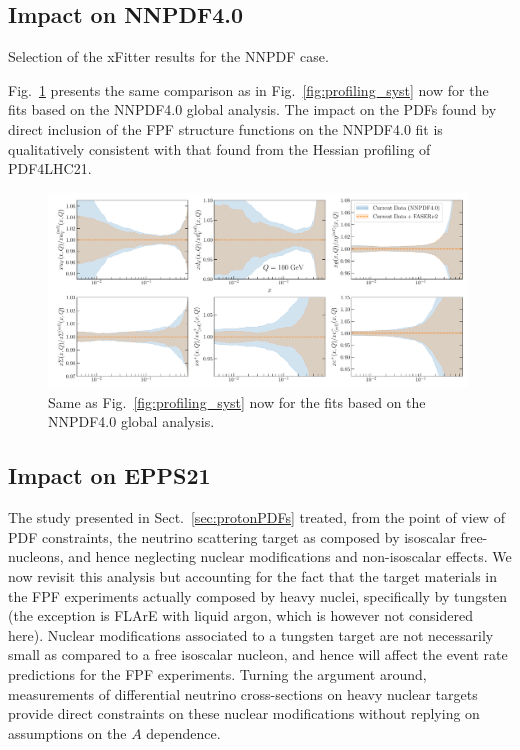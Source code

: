\clearpage


\subsection{Impact on NNPDF4.0}
\label{sec:nnpdf40}

Selection of the {\sc\small xFitter} results for the NNPDF case.

Fig.~\ref{fig:nnpdf40_fasernu2_baseline} presents the same comparison
as in Fig.~\ref{fig:profiling_syst} now for
 the fits
 based on the NNPDF4.0 global analysis.
 The impact on the PDFs found by direct inclusion of the FPF structure
 functions on the NNPDF4.0 fit is qualitatively consistent with
 that found from the Hessian profiling of PDF4LHC21.

\begin{figure}[t]
\centering
\includegraphics[width=0.99\textwidth]{plots/FASERnu2-q100gev-ratios.pdf}
\caption{
  Same as Fig.~\ref{fig:profiling_syst} now for the fits
  based on the NNPDF4.0 global analysis.
%
}
\label{fig:nnpdf40_fasernu2_baseline}
\end{figure}

\clearpage

\subsection{Impact on EPPS21}
\label{sec:nuclearPDFs}

The study presented in Sect.~\ref{sec:protonPDFs} treated, from the point of view
of PDF constraints, the neutrino scattering target
as composed by isoscalar free-nucleons, and hence neglecting nuclear modifications
and non-isoscalar effects.
%
We now revisit this analysis but accounting for the fact that the target materials in the FPF
experiments actually
composed by heavy nuclei, specifically by tungsten (the exception is FLArE with liquid argon, which
is however not considered here).
%
Nuclear modifications associated to a tungsten target are not necessarily small as compared
to a free isoscalar nucleon, and hence will affect the event rate predictions for
the FPF experiments.
%
Turning the argument around, measurements of differential neutrino cross-sections
on heavy nuclear targets provide direct constraints on these nuclear modifications
without replying on assumptions on the $A$ dependence.


